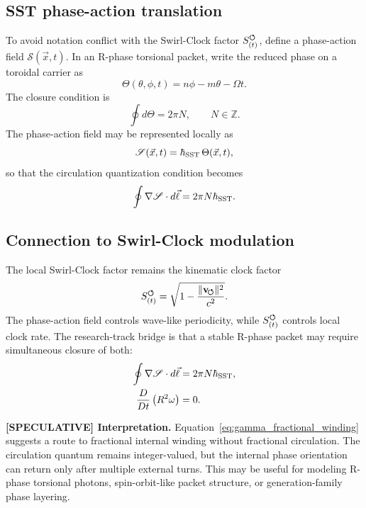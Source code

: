 \subsection{SST phase-action translation}
To avoid notation conflict with the Swirl-Clock factor ${S_{(t)}^{\boldsymbol{\circlearrowleft}}}$, define a phase-action field $\mathscr S(\vec x,t)$. In an R-phase torsional packet, write the reduced phase on a toroidal carrier as
\begin{equation}
    \Theta(\theta,\phi,t)
    = n\phi-m\theta-\Omega t.
    \label{eq:sst_torus_phase}
\end{equation}
The closure condition is
\begin{equation}
    \oint d\Theta = 2\pi N,
    \qquad N\in\mathbb Z.
    \label{eq:phase_closure_condition}
\end{equation}
The phase-action field may be represented locally as
\begin{equation}
    \mathscr S(\vec x,t)=\hbar_{\rm SST}\,\Theta(\vec x,t),
    \label{eq:phase_action_relation}
\end{equation}
so that the circulation quantization condition becomes
\begin{equation}
    \oint \nabla\mathscr S\cdot d\vec\ell
    =2\pi N\hbar_{\rm SST}.
    \label{eq:phase_action_quantization}
\end{equation}

\subsection{Connection to Swirl-Clock modulation}
The local Swirl-Clock factor remains the kinematic clock factor
\begin{equation}
    {S_{(t)}^{\boldsymbol{\circlearrowleft}}}
    =\sqrt{1-\frac{\lVert\mathbf{v}_{\!\boldsymbol{\circlearrowleft}}\rVert^2}{c^2}}.
    \label{eq:swirl_clock_factor_appendix}
\end{equation}
The phase-action field controls wave-like periodicity, while ${S_{(t)}^{\boldsymbol{\circlearrowleft}}}$ controls local clock rate. The research-track bridge is that a stable R-phase packet may require simultaneous closure of both:
\begin{align}
    \oint \nabla\mathscr S\cdot d\vec\ell &=2\pi N\hbar_{\rm SST},\label{eq:phase_closure}\\
    \frac{D}{Dt}\left(R^2\omega\right)&=0.\label{eq:kelvin_closure}
\end{align}

\textbf{[SPECULATIVE] Interpretation.}
Equation~\eqref{eq:gamma_fractional_winding} suggests a route to fractional internal winding without fractional circulation. The circulation quantum remains integer-valued, but the internal phase orientation can return only after multiple external turns. This may be useful for modeling R-phase torsional photons, spin-orbit-like packet structure, or generation-family phase layering.

